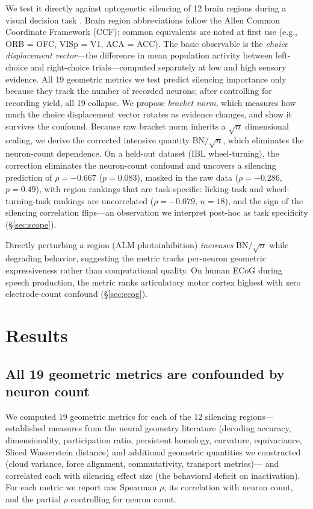 \documentclass[9pt,lineno]{elife}
\begin{document}
We test it directly against optogenetic silencing of 12 brain regions during a visual decision task \citep{steinmetz2019distributed, zatkahaas2021}. Brain region abbreviations follow the Allen Common Coordinate Framework (CCF); common equivalents are noted at first use (e.g., ORB = OFC, VISp = V1, ACA = ACC). The basic observable is the \emph{choice displacement vector}---the difference in mean population activity between left-choice and right-choice trials---computed separately at low and high sensory evidence. All 19 geometric metrics we test predict silencing importance only because they track the number of recorded neurons; after controlling for recording yield, all 19 collapse. We propose \emph{bracket norm}, which measures how much the choice displacement vector rotates as evidence changes, and show it survives the confound. Because raw bracket norm inherits a $\sqrt{n}$ dimensional scaling, we derive the corrected intensive quantity $\text{BN}/\!\sqrt{n}$, which eliminates the neuron-count dependence. On a held-out dataset (IBL wheel-turning), the correction eliminates the neuron-count confound and uncovers a silencing prediction of $\rho = -0.667$ ($p = 0.083$), masked in the raw data ($\rho = -0.286$, $p = 0.49$), with region rankings that are task-specific: licking-task and wheel-turning-task rankings are uncorrelated ($\rho = -0.079$, $n = 18$), and the sign of the silencing correlation flips---an observation we interpret post-hoc as task specificity (\S\ref{sec:scope}).

Directly perturbing a region (ALM photoinhibition) \emph{increases} $\text{BN}/\!\sqrt{n}$ while degrading behavior, suggesting the metric tracks per-neuron geometric expressiveness rather than computational quality. On human ECoG during speech production, the metric ranks articulatory motor cortex highest with zero electrode-count confound (\S\ref{sec:ecog}).


\section{Results}

\subsection{All 19 geometric metrics are confounded by neuron count}
\label{sec:confound}

We computed 19 geometric metrics for each of the 12 silencing regions---established measures from the neural geometry literature (decoding accuracy, dimensionality, participation ratio, persistent homology, curvature, equivariance, Sliced Wasserstein distance) and additional geometric quantities we constructed (cloud variance, force alignment, commutativity, transport metrics)--- and correlated each with silencing effect size (the behavioral deficit on inactivation). For each metric we report raw Spearman $\rho$, its correlation with neuron count, and the partial $\rho$ controlling for neuron count.
\end{document}
